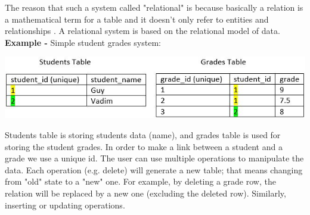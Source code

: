 \documentclass[oneside]{book}
\begin{document}
The reason that such a system called "relational" is because basically a relation is a mathematical term for a table and it doesn't only refer to entities and relationships \cite[p.~26]{introtodb}. A relational system is based on the relational model of data.\\

\textbf{Example -} Simple student grades system:

\begin{center}
\includegraphics[scale=0.9]{table1}
\end{center}

Students table is storing students data (name), and grades table is used for storing the student grades. In order to make a link between a student and a grade we use a unique id. The user can use multiple operations to manipulate the data. Each operation (e.g. delete) will generate a new table; that means changing from "old" state to a "new" one. For example, by deleting a grade row, the relation will be replaced by a new one (excluding the deleted row). Similarly, inserting or updating operations.\\
\end{document}
